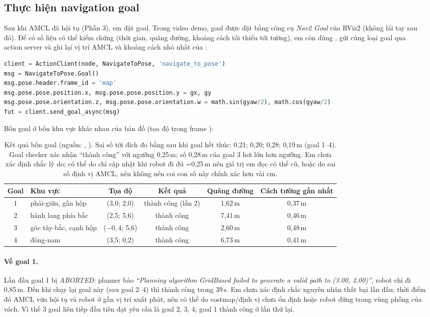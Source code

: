 \subsection{Thực hiện navigation goal}
Sau khi AMCL đã hội tụ (Phần 3), em đặt goal. Trong video demo, goal được đặt bằng công cụ \emph{Nav2 Goal} của RViz2 (không lái tay sau đó).
Để có số liệu có thể kiểm chứng (thời gian, quãng đường, khoảng cách tối thiểu tới tường), em còn dùng , gửi cùng loại goal
 qua action server và ghi lại vị trí AMCL và khoảng cách nhỏ nhất của :
\begin{lstlisting}[language=Python,caption={Trích \file{scripts/send\_goals.py}.}]
client = ActionClient(node, NavigateToPose, 'navigate_to_pose')
msg = NavigateToPose.Goal()
msg.pose.header.frame_id = 'map'
msg.pose.pose.position.x, msg.pose.pose.position.y = gx, gy
msg.pose.pose.orientation.z, msg.pose.pose.orientation.w = math.sin(gyaw/2), math.cos(gyaw/2)
fut = client.send_goal_async(msg)
\end{lstlisting}
Bốn goal ở bốn khu vực khác nhau của bản đồ (tọa độ trong frame ):
\begin{table}[H]\centering\small
\begin{tabular}{clcccc}\toprule
Goal & Khu vực & Tọa độ & Kết quả & Quãng đường & Cách tường gần nhất\\\midrule
1 & phải-giữa, gần hộp & (3,0; 2,0) & thành công (lần 2) & 1,62\,m & 0,37\,m\\
2 & hành lang phía bắc & (2,5; 5,6) & thành công & 7,41\,m & 0,46\,m\\
3 & góc tây-bắc, cạnh hộp & ($-0{,}4$; 5,6) & thành công & 2,60\,m & 0,48\,m\\
4 & đông-nam & (3,5; 0,2) & thành công & 6,73\,m & 0,41\,m\\
\bottomrule\end{tabular}
\caption{Kết quả bốn goal (nguồn: , ). Sai số tới đích đo bằng  sau khi goal kết thúc: 0,21; 0,20; 0,28; 0,19\,m (goal 1--4). Goal checker xác nhận ``thành công'' với ngưỡng 0,25\,m; số 0,28\,m của goal 3 hơi lớn hơn ngưỡng. Em chưa xác định chắc lý do; có thể do  chỉ cập nhật khi robot đi đủ =0,25\,m nên giá trị em đọc có thể cũ, hoặc do sai số định vị AMCL, nên không nên coi con số này chính xác hơn vài cm.}\label{tab:goals}
\end{table}
\paragraph{Về goal 1.} Lần đầu goal 1 bị \emph{ABORTED}: planner báo
\emph{``Planning algorithm GridBased failed to generate a valid path to (3.00, 2.00)''}, robot chỉ đi 0,85\,m.
Đến khi chạy lại goal này (sau goal 2--4) thì thành công trong 39\,s. Em chưa xác định chắc nguyên nhân thất bại lần đầu; thời điểm đó
AMCL vừa hội tụ và robot ở gần vị trí xuất phát, nên có thể do costmap/định vị chưa ổn định hoặc robot đứng trong vùng phồng của vách. Vì thế 3 goal liên tiếp đầu tiên
đạt yêu cầu là goal 2, 3, 4; goal 1 thành công ở lần thử lại.

